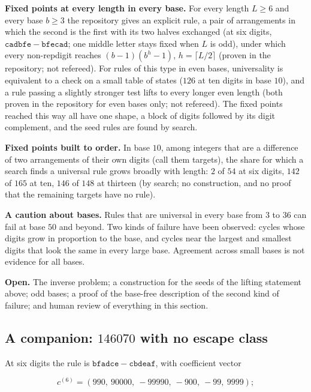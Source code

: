 \documentclass[11pt,letterpaper]{article}
\theoremstyle{paperstyle}
\theoremstyle{paperstyledef}
\theoremstyle{paperstylerem}
\begin{document}
\textbf{Fixed points at every length in every base.} For every length \(L \geq 6\) and every base \(b \geq 3\) the repository gives an explicit rule, a pair of arrangements in which the second is the first with its two halves exchanged (at six digits, \(\mathtt{cadbfe} - \mathtt{bfecad}\); one middle letter stays fixed when \(L\) is odd), under which every non-repdigit reaches \((b-1)(b^{h} - 1)\), \(h = \lceil L/2 \rceil\) (proven in the repository; not refereed). For rules of this type in even bases, universality is equivalent to a check on a small table of states (\(126\) at ten digits in base \(10\)), and a rule passing a slightly stronger test lifts to every longer even length (both proven in the repository for even bases only; not refereed). The fixed points reached this way all have one shape, a block of digits followed by its digit complement, and the seed rules are found by search.

\textbf{Fixed points built to order.} In base \(10\), among integers that are a difference of two arrangements of their own digits (call them targets), the share for which a search finds a universal rule grows broadly with length: \(2\) of \(54\) at six digits, \(142\) of \(165\) at ten, \(146\) of \(148\) at thirteen (by search; no construction, and no proof that the remaining targets have no rule).

\textbf{A caution about bases.} Rules that are universal in every base from \(3\) to \(36\) can fail at base \(50\) and beyond. Two kinds of failure have been observed: cycles whose digits grow in proportion to the base, and cycles near the largest and smallest digits that look the same in every large base. Agreement across small bases is not evidence for all bases.

\textbf{Open.} The inverse problem; a construction for the seeds of the lifting statement above; odd bases; a proof of the base-free description of the second kind of failure; and human review of everything in this section.

\subsection{\texorpdfstring{A companion: \(146070\) with no escape class}{A companion: 146070 with no escape class}}\label{a-companion-146070-with-no-escape-class}

At six digits the rule is \(\mathtt{bfadce} - \mathtt{cbdeaf}\), with coefficient vector

\[c^{(6)} = (990,\ 90000,\ -99990,\ -900,\ -99,\ 9999);\]
\end{document}
